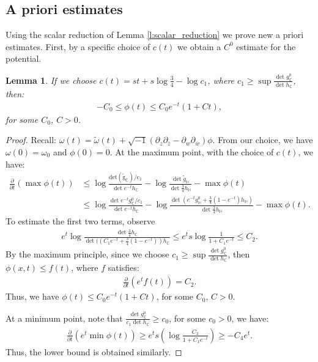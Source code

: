 \documentclass[12pt]{amsart}
\numberwithin{equation}{section}
\newtheorem{lemma}[prop]{Lemma}
\numberwithin{prop}{section}
\theoremstyle{definition}
\newcommand{\til}[1]{\widetilde{#1}}
\renewcommand{\bar}[1]{\overline{#1}}
\begin{document}
%
%
\subsection{A priori estimates}
%
%

Using the scalar reduction of Lemma \ref{l:scalar_reduction} we prove new a priori estimates.  First, by a specific choice of $c(t)$ we obtain a $C^0$ estimate for the potential.
\begin{lemma}\label{l:C0 bound}
    If we choose $c(t)=st+ s\operatorname{log}\frac{3}{4}-\operatorname{log}c_1$, where $c_1\geq \sup\frac{\operatorname{det}g_{\mathbb{C}}^0}{\operatorname{det}h_\mathbb{C}}$, then:
    \begin{align*}
        -C_0\leq\phi(t)\leq C_0 e^{-t}(1+Ct),
    \end{align*}
    for some $C_0$, $C>0$.
\end{lemma}
\begin{proof}
    Recall: $\omega(t)=\til{\omega}(t)+\sqrt{-1}(\partial_z\partial_{\bar{z}}-\partial_w\partial_{\bar{w}})\phi$. From our choice, we have $\omega(0) = \omega_0$ and $\phi(0) = 0$. At the maximum point, with the choice of $c(t)$, we have:
    \begin{align*}
        \frac{\partial}{\partial t}(\max\phi(t)) &\leq \operatorname{log}\frac{\operatorname{det(\til{g}_\mathbb{C})/c_1}}{\operatorname{det} e^{-t} h_\mathbb{C}} - \operatorname{log}\frac{\operatorname{det}\til{g}_\mathbb{H}}{\operatorname{det} \frac{3}{4} h_\mathbb{H}} - \max \phi(t)\\
        &\leq \operatorname{log}\frac{\operatorname{det}e^{-t}g_\mathbb{C}^0/c_1}{\operatorname{det} e^{-t}h_\mathbb{C}} - \operatorname{log}\frac{\operatorname{det}(e^{-t}g_\mathbb{H}^0 + \frac{3}{4}(1-e^{-t})h_\mathbb{H})}{\operatorname{det}\frac{3}{4}h_\mathbb{H}} - \max\phi(t).
    \end{align*}
    To estimate the first two terms, observe
    \begin{align*}
e^t\operatorname{log}\frac{\operatorname{det}\frac{3}{4}h_\mathbb{C}}{\operatorname{det}((C_1e^{-t}+\frac{3}{4}(1-e^{-t}))h_\mathbb{C}}\leq e^ts\operatorname{log} \frac{1}{1+C_1e^{-t}}\leq C_2.
    \end{align*}
    By the maximum principle, since we choose $c_1\geq \sup\frac{\operatorname{det}g_{\mathbb{C}}^0}{\operatorname{det}h_\mathbb{C}}$, then $\phi(x,t)\leq f(t)$, where $f$ satisfies:
    \begin{align*}
        \frac{\partial}{\partial t}(e^tf(t)) = C_2.
    \end{align*}
    Thus, we have $\phi(t)\leq C_0e^{-t}(1+Ct)$, for some $C_0$, $C>0$.

    At a minimum point, note that $\frac{\operatorname{det}g_{\mathbb{C}}^0}{c_1\operatorname{det}h_\mathbb{C}}\geq c_0$, for some $c_0 >0$, we have:
    \begin{align*}
        \frac{\partial}{\partial t}(e^t\min\phi(t))\geq e^ts(\operatorname{log}\frac{C_3}{1+C_1 e^{-t}})\geq-C_4 e^t.
    \end{align*}
    Thus, the lower bound is obtained similarly.
\end{proof}
\end{document}

